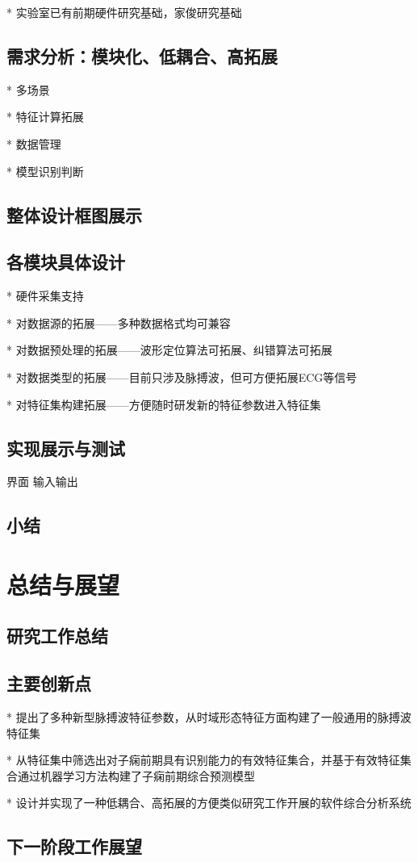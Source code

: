 * 实验室已有前期硬件研究基础，家俊研究基础

\section{需求分析：模块化、低耦合、高拓展}
* 多场景

* 特征计算拓展

* 数据管理

* 模型识别判断

\section{整体设计框图展示}

\section{各模块具体设计}
* 硬件采集支持

* 对数据源的拓展——多种数据格式均可兼容

* 对数据预处理的拓展——波形定位算法可拓展、纠错算法可拓展

* 对数据类型的拓展——目前只涉及脉搏波，但可方便拓展ECG等信号

* 对特征集构建拓展——方便随时研发新的特征参数进入特征集

\section{实现展示与测试}
界面
输入输出
\section{小结}

\chapter{总结与展望}
\section{研究工作总结}
\section{主要创新点}
* 提出了多种新型脉搏波特征参数，从时域形态特征方面构建了一般通用的脉搏波特征集

* 从特征集中筛选出对子痫前期具有识别能力的有效特征集合，并基于有效特征集合通过机器学习方法构建了子痫前期综合预测模型

* 设计并实现了一种低耦合、高拓展的方便类似研究工作开展的软件综合分析系统

\section{下一阶段工作展望}



